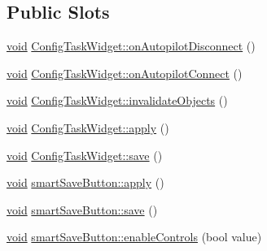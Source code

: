 \subsection*{\-Public \-Slots}
\begin{DoxyCompactItemize}
\item 
\hyperlink{group___u_a_v_objects_plugin_ga444cf2ff3f0ecbe028adce838d373f5c}{void} \hyperlink{group___u_a_v_object_widget_utils_ga306b82fa3b114ce5c336dfda60ae479d}{\-Config\-Task\-Widget\-::on\-Autopilot\-Disconnect} ()
\item 
\hyperlink{group___u_a_v_objects_plugin_ga444cf2ff3f0ecbe028adce838d373f5c}{void} \hyperlink{group___u_a_v_object_widget_utils_gaf5b2ddc9de02820e89c8133f5625607d}{\-Config\-Task\-Widget\-::on\-Autopilot\-Connect} ()
\item 
\hyperlink{group___u_a_v_objects_plugin_ga444cf2ff3f0ecbe028adce838d373f5c}{void} \hyperlink{group___u_a_v_object_widget_utils_ga1505f6e22cf2e4167b03fca9417f91a5}{\-Config\-Task\-Widget\-::invalidate\-Objects} ()
\item 
\hyperlink{group___u_a_v_objects_plugin_ga444cf2ff3f0ecbe028adce838d373f5c}{void} \hyperlink{group___u_a_v_object_widget_utils_ga139dc5f372c46b8ad1614d637e762018}{\-Config\-Task\-Widget\-::apply} ()
\item 
\hyperlink{group___u_a_v_objects_plugin_ga444cf2ff3f0ecbe028adce838d373f5c}{void} \hyperlink{group___u_a_v_object_widget_utils_gabae71bcf9c71f99595c365fd49b342fc}{\-Config\-Task\-Widget\-::save} ()
\item 
\hyperlink{group___u_a_v_objects_plugin_ga444cf2ff3f0ecbe028adce838d373f5c}{void} \hyperlink{group___u_a_v_object_widget_utils_ga453b1bbd8b56fa6af4f362b00221b265}{smart\-Save\-Button\-::apply} ()
\item 
\hyperlink{group___u_a_v_objects_plugin_ga444cf2ff3f0ecbe028adce838d373f5c}{void} \hyperlink{group___u_a_v_object_widget_utils_gad0e6541ace97075634254ba3b1cc9bf9}{smart\-Save\-Button\-::save} ()
\item 
\hyperlink{group___u_a_v_objects_plugin_ga444cf2ff3f0ecbe028adce838d373f5c}{void} \hyperlink{group___u_a_v_object_widget_utils_ga56d88dfdb1b735dbaf2c957e32fca452}{smart\-Save\-Button\-::enable\-Controls} (bool value)
\end{DoxyCompactItemize}
